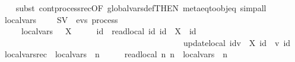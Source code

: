 \begin{isabellebody}
%
\isadelimproof
\ \ %
\endisadelimproof
%
\isatagproof
{}\isamarkupfalse%
\ {\isacharparenleft}{\kern0pt}subst\ cont{\isacharunderscore}{\kern0pt}process{\isacharunderscore}{\kern0pt}rec{\isacharbrackleft}{\kern0pt}OF\ global{\isacharunderscore}{\kern0pt}vars{\isacharunderscore}{\kern0pt}def{\isacharbrackleft}{\kern0pt}THEN\ meta{\isacharunderscore}{\kern0pt}eq{\isacharunderscore}{\kern0pt}to{\isacharunderscore}{\kern0pt}obj{\isacharunderscore}{\kern0pt}eq{\isacharbrackright}{\kern0pt}{\isacharbrackright}{\kern0pt}{\isacharparenright}{\kern0pt}\ simp{\isacharunderscore}{\kern0pt}all%
\endisatagproof
{\isafoldproof}%
%
\isadelimproof
%
\endisadelimproof
%
\isadelimdocument
%
\endisadelimdocument
%
\isatagdocument
%
\isamarkuptrue%
%
\endisatagdocument
{\isafolddocument}%
%
\isadelimdocument
%
\endisadelimdocument
{}\isamarkupfalse%
\ local{\isacharunderscore}{\kern0pt}vars\ {\isacharcolon}{\kern0pt}{\isacharcolon}{\kern0pt}\ {\isachardoublequoteopen}\ {\isasymsigma}\ {\isasymRightarrow}\ SV\ {\isasymRightarrow}\ evs\ process{\isachardoublequoteclose}\ \isanewline
\ \ \ \ \ {\isacartoucheopen}local{\isacharunderscore}{\kern0pt}vars\ {\isasymequiv}\ {\isasymmu}\ X{\isachardot}{\kern0pt}\ \ \ {\isacharparenleft}{\kern0pt}{\isasymlambda}\ {\isasymsigma}{\isachardot}{\kern0pt}\ {\isacharparenleft}{\kern0pt}{\isasymlambda}\ id{\isachardot}{\kern0pt}\ \ {\isacharparenleft}{\kern0pt}{\isacharparenleft}{\kern0pt}read\isactrlsub l\isactrlsub o\isactrlsub c\isactrlsub a\isactrlsub l\ id{\isacharparenright}{\kern0pt}\isactrlbold {\isacharbang}{\kern0pt}{\isacharparenleft}{\kern0pt}{\isasymsigma}\ id{\isacharparenright}{\kern0pt}\ {\isasymrightarrow}\ X\ {\isasymsigma}\ id{\isacharparenright}{\kern0pt}\ \isanewline
\ \ \ \ \ \ \ \ \ \ \ \ \ \ \ \ \ \ \ \ \ \ \ \ \ \ \ \ \ \ \ \ \ \ \ \ \ \ \ \ \ \ \ {\isasymbox}\ {\isacharparenleft}{\kern0pt}{\isacharparenleft}{\kern0pt}update\isactrlsub l\isactrlsub o\isactrlsub c\isactrlsub a\isactrlsub l\ id{\isacharparenright}{\kern0pt}\isactrlbold {\isacharquery}{\kern0pt}v\ {\isasymrightarrow}\ X\ {\isacharparenleft}{\kern0pt}{\isasymsigma}{\isacharparenleft}{\kern0pt}id\ {\isacharcolon}{\kern0pt}{\isacharequal}{\kern0pt}\ v{\isacharparenright}{\kern0pt}{\isacharparenright}{\kern0pt}\ id\ {\isacharparenright}{\kern0pt}{\isacharparenright}{\kern0pt}{\isacharparenright}{\kern0pt}{\isacartoucheclose}\isanewline
\isanewline
{}\isamarkupfalse%
\ local{\isacharunderscore}{\kern0pt}vars{\isacharunderscore}{\kern0pt}rec\ {\isacharcolon}{\kern0pt}\ {\isacartoucheopen}local{\isacharunderscore}{\kern0pt}vars\ {\isasymsigma}\ n\ {\isacharequal}{\kern0pt}\ \ \ \ \ {\isacharparenleft}{\kern0pt}{\isacharparenleft}{\kern0pt}read\isactrlsub l\isactrlsub o\isactrlsub c\isactrlsub a\isactrlsub l\ n{\isacharparenright}{\kern0pt}\isactrlbold {\isacharbang}{\kern0pt}{\isacharparenleft}{\kern0pt}{\isasymsigma}\ n{\isacharparenright}{\kern0pt}\ {\isasymrightarrow}\ local{\isacharunderscore}{\kern0pt}vars\ {\isasymsigma}\ n{\isacharparenright}{\kern0pt}\ \isanewline

\end{isabellebody}
